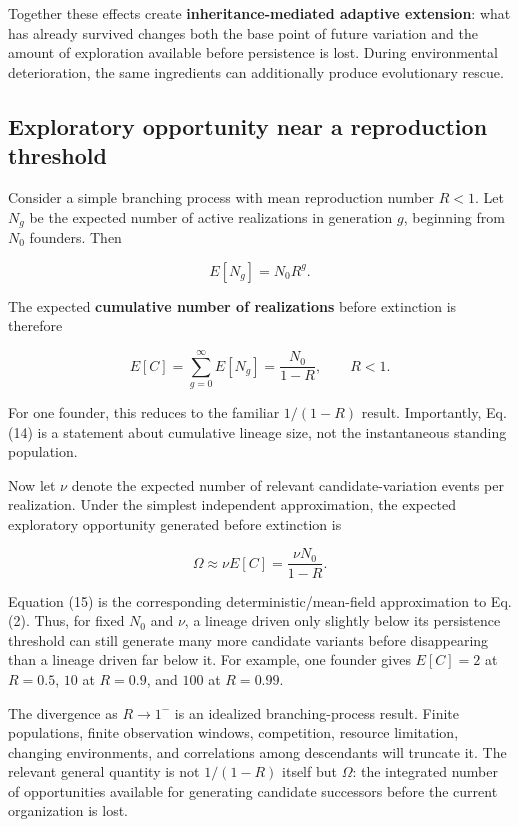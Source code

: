 \documentclass[11pt,a4paper]{article}
\begin{document}
Together these effects create \textbf{inheritance-mediated adaptive
extension}: what has already survived changes both the base point of
future variation and the amount of exploration available before
persistence is lost. During environmental deterioration, the same
ingredients can additionally produce evolutionary rescue.

\subsection{Exploratory opportunity near a reproduction
threshold}\label{exploratory-opportunity-near-a-reproduction-threshold}

Consider a simple branching process with mean reproduction number
\(R<1\). Let \(N_g\) be the expected number of active realizations in
generation \(g\), beginning from \(N_0\) founders. Then

\[
E[N_g]=N_0R^g.
\]

The expected \textbf{cumulative number of realizations} before
extinction is therefore

\[
E[C]
=
\sum_{g=0}^{\infty}E[N_g]
=
\frac{N_0}{1-R},
\qquad R<1.
\tag{14}
\]

For one founder, this reduces to the familiar \(1/(1-R)\) result.
Importantly, Eq. (14) is a statement about cumulative lineage size, not
the instantaneous standing population.

Now let \(\nu\) denote the expected number of relevant
candidate-variation events per realization. Under the simplest
independent approximation, the expected exploratory opportunity
generated before extinction is

\[
\boxed{
\Omega
\approx
\nu E[C]
=
\frac{\nu N_0}{1-R}.
}
\tag{15}
\]

Equation (15) is the corresponding deterministic/mean-field
approximation to Eq. (2). Thus, for fixed \(N_0\) and \(\nu\), a lineage
driven only slightly below its persistence threshold can still generate
many more candidate variants before disappearing than a lineage driven
far below it. For example, one founder gives \(E[C]=2\) at \(R=0.5\),
\(10\) at \(R=0.9\), and \(100\) at \(R=0.99\).

The divergence as \(R\to1^-\) is an idealized branching-process result.
Finite populations, finite observation windows, competition, resource
limitation, changing environments, and correlations among descendants
will truncate it. The relevant general quantity is not \(1/(1-R)\)
itself but \(\Omega\): the integrated number of opportunities available
for generating candidate successors before the current organization is
lost.
\end{document}
